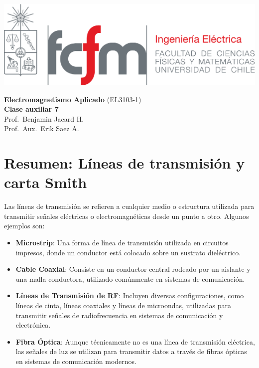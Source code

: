 \documentclass[
  11pt,
  letterpaper,
   addpoints,
   answers
  ]{exam}
\begin{document}
\noindent
\begin{minipage}{0.47\textwidth}
\includegraphics[width=\textwidth]{../fcfm_die}
\end{minipage}
\begin{minipage}{0.53\textwidth}
\begin{center} 
\large\textbf{Electromagnetismo Aplicado} (EL3103-1) \\
\large\textbf{Clase auxiliar 7} \\
\normalsize Prof.~Benjamin Jacard H.\\
\normalsize Prof.~Aux.~Erik Saez A.
\end{center}
\end{minipage}

\section{Resumen: Líneas de transmisión y carta Smith}

Las líneas de transmisión se refieren a cualquier medio o estructura utilizada para transmitir señales eléctricas o electromagnéticas desde un punto a otro. Algunos ejemplos son:
\begin{itemize}
    \item \textbf{Microstrip}: Una forma de línea de transmisión utilizada en circuitos impresos, donde un conductor está colocado sobre un sustrato dieléctrico.
    \item \textbf{Cable Coaxial}: Consiste en un conductor central rodeado por un aislante y una malla conductora, utilizado comúnmente en sistemas de comunicación.
    \item \textbf{Líneas de Transmisión de RF}: Incluyen diversas configuraciones, como líneas de cinta, líneas coaxiales y líneas de microondas, utilizadas para transmitir señales de radiofrecuencia en sistemas de comunicación y electrónica.
    \item \textbf{Fibra Óptica}: Aunque técnicamente no es una línea de transmisión eléctrica, las señales de luz se utilizan para transmitir datos a través de fibras ópticas en sistemas de comunicación modernos.
\end{itemize}
\end{document}
